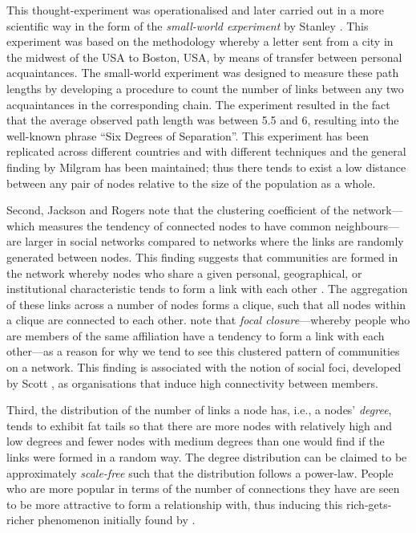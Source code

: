 This thought-experiment was operationalised and later carried out in a more scientific way in the form of the \emph{small-world experiment} by Stanley \citet{Milgram1967}. This experiment was based on the methodology whereby a letter sent from a city in the midwest of the USA to Boston, USA, by means of transfer between personal acquaintances. The small-world experiment was designed to measure these path lengths by developing a procedure to count the number of links between any two acquaintances in the corresponding chain. The experiment resulted in the fact that the average observed path length was between 5.5 and 6, resulting into the well-known phrase ``Six Degrees of Separation''. This experiment has been replicated across different countries and with different techniques and the general finding by Milgram has been maintained; thus there tends to exist a low distance between any pair of nodes relative to the size of the population as a whole.

Second, Jackson and Rogers note that the clustering coefficient of the network---which measures the tendency of connected nodes to have common neighbours---are larger in social networks compared to networks where the links are randomly generated between nodes. This finding suggests that communities are formed in the network whereby nodes who share a given personal, geographical, or institutional characteristic tends to form a link with each other \citep{Watts2002}. The aggregation of these links across a number of nodes forms a clique, such that all nodes within a clique are connected to each other. \citet{KossinetsWatts2006} note that \emph{focal closure}---whereby people who are members of the same affiliation have a tendency to form a link with each other---as a reason for why we tend to see this clustered pattern of communities on a network. This finding is associated with the notion of social foci, developed by Scott \citet{Feld1981, Feld1982}, as organisations that induce high connectivity between members.

Third, the distribution of the number of links a node has, i.e., a nodes' \emph{degree}, tends to exhibit fat tails so that there are more nodes with relatively high and low degrees and fewer nodes with medium degrees than one would find if the links were formed in a random way. The degree distribution can be claimed to be approximately \emph{scale-free} such that the distribution follows a power-law. People who are more popular in terms of the number of connections they have are seen to be more attractive to form a relationship with, thus inducing this rich-gets-richer phenomenon initially found by \citet{Simon1955}.

